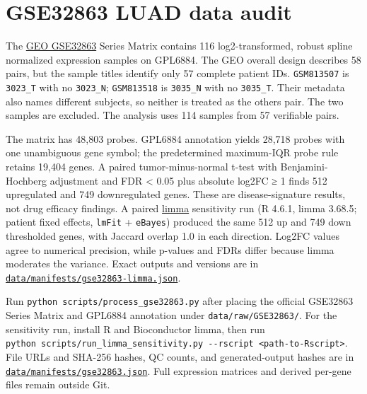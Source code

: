\documentclass[
  10pt,
]{ctexart}
\author{}
\date{}
\begin{document}
\section{GSE32863 LUAD data audit}\label{gse32863-luad-data-audit}

The
\href{https://www.ncbi.nlm.nih.gov/geo/query/acc.cgi?acc=GSE32863}{GEO
GSE32863} Series Matrix contains 116 log2-transformed, robust spline
normalized expression samples on GPL6884. The GEO overall design
describes 58 pairs, but the sample titles identify only 57 complete
patient IDs. \texttt{GSM813507} is \texttt{3023\_\allowbreak{}T} with no
\texttt{3023\_\allowbreak{}N}; \texttt{GSM813518} is \texttt{3035\_\allowbreak{}N} with no
\texttt{3035\_\allowbreak{}T}. Their metadata also names different subjects, so
neither is treated as the other\textquotesingle s pair. The two samples
are excluded. The analysis uses 114 samples from 57 verifiable pairs.

The matrix has 48,803 probes. GPL6884 annotation yields 28,718 probes
with one unambiguous gene symbol; the predetermined maximum-IQR probe
rule retains 19,404 genes. A paired tumor-minus-normal t-test with
Benjamini-Hochberg adjustment and FDR \textless{} 0.05 plus absolute
log2FC ≥ 1 finds 512 upregulated and 749 downregulated genes. These are
disease-signature results, not drug efficacy findings. A paired
\href{https://bioconductor.org/packages/release/bioc/html/limma.html}{limma}
sensitivity run (R 4.6.1, limma 3.68.5; patient fixed effects,
\texttt{lmFit} + \texttt{eBayes}) produced the same 512 up and 749 down
thresholded genes, with Jaccard overlap 1.0 in each direction. Log2FC
values agree to numerical precision, while p-values and FDRs differ
because limma moderates the variance. Exact outputs and versions are in
\href{../data/manifests/gse32863-limma.json}{\texttt{data/\allowbreak{}manifests/\allowbreak{}gse32863-limma.\allowbreak{}json}}.

Run \texttt{python\ scripts/\allowbreak{}process\_\allowbreak{}gse32863.\allowbreak{}py} after placing the
official GSE32863 Series Matrix and GPL6884 annotation under
\texttt{data/\allowbreak{}raw/\allowbreak{}GSE32863/\allowbreak{}}. For the sensitivity run, install R and
Bioconductor limma, then run
\texttt{python\ scripts/\allowbreak{}run\_\allowbreak{}limma\_\allowbreak{}sensitivity.\allowbreak{}py\ -\/\allowbreak{}-rscript\ \textless{}path-to-Rscript\textgreater{}}.
File URLs and SHA-256 hashes, QC counts, and generated-output hashes are
in
\href{../data/manifests/gse32863.json}{\texttt{data/\allowbreak{}manifests/\allowbreak{}gse32863.\allowbreak{}json}}.
Full expression matrices and derived per-gene files remain outside Git.
\end{document}
